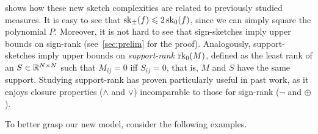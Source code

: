 \documentclass{article}
\begin{document}
 shows how these new sketch complexities are related to previously studied  measures. It is easy to see that $\operatorname{sk}_\pm(f)\leqslant 2\operatorname{sk}_0(f)$, since we can simply square the polynomial $P$. 
Moreover, it is not hard to see that sign-sketches imply upper bounds on sign-rank (see~\cref{sec:prelim} for the proof). Analogously, support-sketches imply upper bounds on \emph{support-rank} $\operatorname{rk}_0(M)$, defined as the least rank of an $S\in\mathbb{R}^{N\times N}$ such that $M_{ij}=0$ iff $S_{ij}=0$, that is, $M$ and $S$ have the same support. Studying support-rank has proven particularly useful in past work, as it enjoys closure properties ($\land$ and $\lor$) incomparable to those for sign-rank ($\neg$ and $\oplus$).

To better grasp our new model, consider the following examples.
\end{document}
